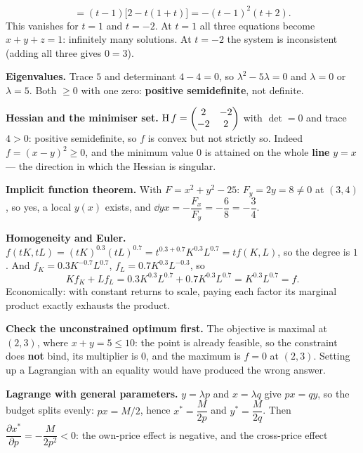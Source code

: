 \begin{solutions}
\[          =(t-1)\bigl[2-t(1+t)\bigr]
          =-(t-1)^{2}(t+2).
        \]
        This vanishes for $t=1$ and $t=-2$. At $t=1$ all three equations
        become $x+y+z=1$: infinitely many solutions. At $t=-2$ the system
        is inconsistent (adding all three gives $0=3$).
  \item \textbf{Eigenvalues.} Trace $5$ and determinant $4-4=0$, so
        $\lambda^{2}-5\lambda=0$ and $\lambda=0$ or $\lambda=5$. Both
        $\ge0$ with one zero: \textbf{positive semidefinite}, not definite.
  \item \textbf{Hessian and the minimiser set.}
        $\operatorname{H} f=\begin{pmatrix}2&-2\\-2&2\end{pmatrix}$ with
        $\det=0$ and trace $4>0$: positive semidefinite, so $f$ is convex
        but not strictly so. Indeed $f=(x-y)^{2}\ge0$, and the minimum
        value $0$ is attained on the whole \textbf{line} $y=x$ --- the
        direction in which the Hessian is singular.
  \item \textbf{Implicit function theorem.} With
        $F=x^{2}+y^{2}-25$: $F_{y}=2y=8\neq0$ at $(3,4)$, so yes, a local
        $y(x)$ exists, and
        $\dd{y}{x}=-\dfrac{F_{x}}{F_{y}}=-\dfrac{6}{8}=-\dfrac34$.
  \item \textbf{Homogeneity and Euler.}
        $f(tK,tL)=(tK)^{0.3}(tL)^{0.7}=t^{0.3+0.7}K^{0.3}L^{0.7}=tf(K,L)$,
        so the degree is $1$. And
        $f_{K}=0.3K^{-0.7}L^{0.7}$, $f_{L}=0.7K^{0.3}L^{-0.3}$, so
        \[
          Kf_{K}+Lf_{L}=0.3K^{0.3}L^{0.7}+0.7K^{0.3}L^{0.7}
          =K^{0.3}L^{0.7}=f .
        \]
        Economically: with constant returns to scale, paying each factor
        its marginal product exactly exhausts the product.
  \item \textbf{Check the unconstrained optimum first.} The objective is
        maximal at $(2,3)$, where $x+y=5\le10$: the point is already
        feasible, so the constraint does \textbf{not} bind, its multiplier
        is $0$, and the maximum is $f=0$ at $(2,3)$. Setting up a
        Lagrangian with an equality would have produced the wrong answer.
  \item \textbf{Lagrange with general parameters.} $y=\lambda p$ and
        $x=\lambda q$ give $px=qy$, so the budget splits evenly:
        $px=M/2$, hence $x^{*}=\dfrac{M}{2p}$ and $y^{*}=\dfrac{M}{2q}$.
        Then $\dfrac{\partial x^{*}}{\partial p}=-\dfrac{M}{2p^{2}}<0$:
        the own-price effect is negative, and the cross-price effect

\end{solutions}
